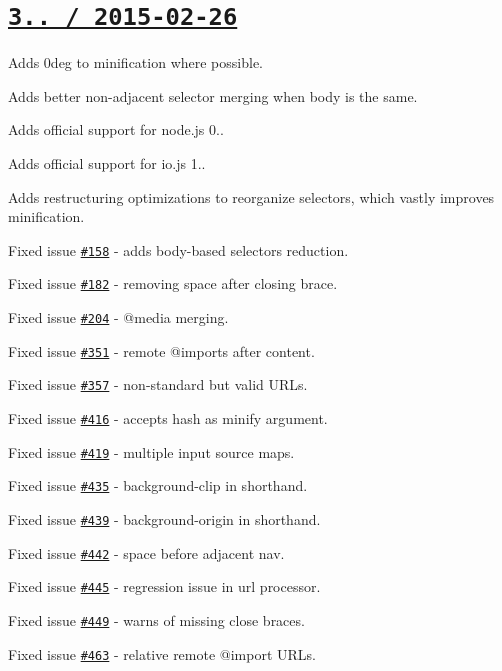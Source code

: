 \section*{\href{https://github.com/jakubpawlowicz/clean-css/compare/v3.0.10...v3.1.0}{\tt 3.. / 2015-\/02-\/26} }


\begin{DoxyItemize}
\item Adds {\ttfamily 0deg} to {} minification where possible.
\item Adds better non-\/adjacent selector merging when body is the same.
\item Adds official support for node.\+js 0..
\item Adds official support for io.\+js 1..
\item Adds restructuring optimizations to reorganize selectors, which vastly improves minification.
\item Fixed issue \href{https://github.com/jakubpawlowicz/clean-css/issues/158}{\tt \#158} -\/ adds body-\/based selectors reduction.
\item Fixed issue \href{https://github.com/jakubpawlowicz/clean-css/issues/182}{\tt \#182} -\/ removing space after closing brace.
\item Fixed issue \href{https://github.com/jakubpawlowicz/clean-css/issues/204}{\tt \#204} -\/ {\ttfamily @media} merging.
\item Fixed issue \href{https://github.com/jakubpawlowicz/clean-css/issues/351}{\tt \#351} -\/ remote {\ttfamily @import}s after content.
\item Fixed issue \href{https://github.com/jakubpawlowicz/clean-css/issues/357}{\tt \#357} -\/ non-\/standard but valid U\+R\+Ls.
\item Fixed issue \href{https://github.com/jakubpawlowicz/clean-css/issues/416}{\tt \#416} -\/ accepts hash as {\ttfamily minify} argument.
\item Fixed issue \href{https://github.com/jakubpawlowicz/clean-css/issues/419}{\tt \#419} -\/ multiple input source maps.
\item Fixed issue \href{https://github.com/jakubpawlowicz/clean-css/issues/435}{\tt \#435} -\/ {\ttfamily background-\/clip} in shorthand.
\item Fixed issue \href{https://github.com/jakubpawlowicz/clean-css/issues/439}{\tt \#439} -\/ {\ttfamily background-\/origin} in shorthand.
\item Fixed issue \href{https://github.com/jakubpawlowicz/clean-css/issues/442}{\tt \#442} -\/ space before adjacent {\ttfamily nav}.
\item Fixed issue \href{https://github.com/jakubpawlowicz/clean-css/issues/445}{\tt \#445} -\/ regression issue in url processor.
\item Fixed issue \href{https://github.com/jakubpawlowicz/clean-css/issues/449}{\tt \#449} -\/ warns of missing close braces.
\item Fixed issue \href{https://github.com/jakubpawlowicz/clean-css/issues/463}{\tt \#463} -\/ relative remote {\ttfamily @import} U\+R\+Ls.
\end{DoxyItemize}

